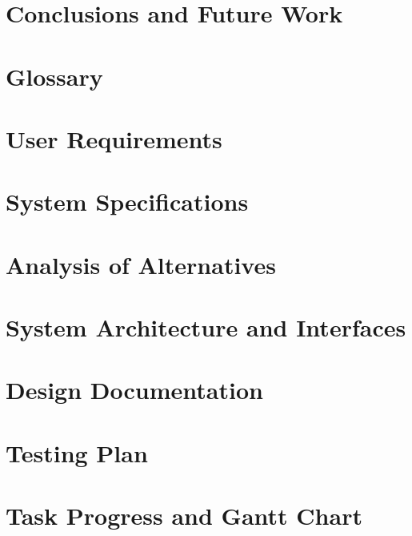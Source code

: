 \documentclass[12pt]{article}
\begin{document}
\section{Conclusions and Future Work}


\appendix
\section{Glossary}
\section{User Requirements}
\section{System Specifications}
\section{Analysis of Alternatives}
\section{System Architecture and Interfaces}
\section{Design Documentation}
\section{Testing Plan}
\section{Task Progress and Gantt Chart}
\end{document}
